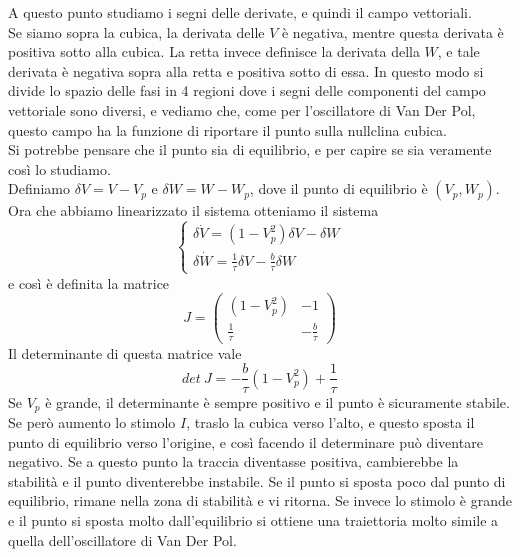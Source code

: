 \documentclass[12pt]{article}
\begin{document}
\begin{figure}[H]
	\centering
	
\end{figure}
A questo punto studiamo i segni delle derivate, e quindi il campo vettoriali. \\
Se siamo sopra la cubica, la derivata delle $V$ è negativa, mentre questa derivata è positiva sotto alla cubica. La retta invece definisce la derivata della $W$, e tale derivata è negativa sopra alla retta e positiva sotto di essa. In questo modo si divide lo spazio delle fasi in 4 regioni dove i segni delle componenti del campo vettoriale sono diversi, e vediamo che, come per l'oscillatore di Van Der Pol, questo campo ha la funzione di riportare il punto sulla nullclina cubica. \\
Si potrebbe pensare che il punto sia di equilibrio, e per capire se sia veramente così lo studiamo. \\
Definiamo $\delta V = V - V_p$ e $\delta W = W - W_p$, dove il punto di equilibrio è $(V_p,W_p)$. Ora che abbiamo linearizzato il sistema otteniamo il sistema
\begin{equation}
	\begin{cases}
		\delta \dot{V} = (1-V^2_p)\delta V - \delta W \\
		\delta \dot{W} = \frac{1}{\tau}\delta V - \frac{b}{\tau}\delta W 
	\end{cases}
\end{equation}
e così è definita la matrice 
\begin{equation}
	J = \begin{pmatrix}
		(1-V_p^2) & -1 \\
		\frac{1}{\tau} & -\frac{b}{\tau}
	\end{pmatrix}
\end{equation}
Il determinante di questa matrice vale
$$
	det \ J = -\frac{b}{\tau}(1-V_p^2) + \frac{1}{\tau}
$$
Se $V_p$ è grande, il determinante è sempre positivo e il punto è sicuramente stabile. \\
Se però aumento lo stimolo $I$, traslo la cubica verso l'alto, e questo sposta il punto di equilibrio verso l'origine, e così facendo il determinare può diventare negativo. Se a questo punto la traccia diventasse positiva, cambierebbe la stabilità e il punto diventerebbe instabile. Se il punto si sposta poco dal punto di equilibrio, rimane nella zona di stabilità e vi ritorna. Se invece lo stimolo è grande e il punto si sposta molto dall'equilibrio si ottiene una traiettoria molto simile a quella dell'oscillatore di Van Der Pol. \\ 
\end{document}
